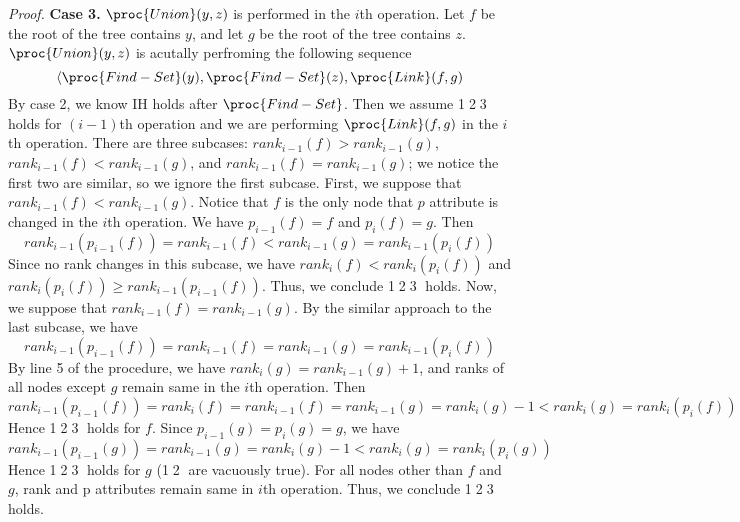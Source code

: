 \begin{proof}
    \textbf{Case 3.}
    $\proc{Union}(y,z)$ is performed in the $i$th operation.
    Let $f$ be the root of the tree contains $y$,
    and let $g$ be the root of the tree contains $z$.
    $\proc{Union}(y,z)$ is acutally perfroming the following sequence
    \begin{equation*}
        \langle \proc{Find-Set}(y), \proc{Find-Set}(z), \proc{Link}(f,g)
    \end{equation*}
    By case 2, we know IH holds after $\proc{Find-Set}$.
    Then we assume \textcircled{1}\textcircled{2}\textcircled{3} holds for $(i-1)$th operation
    and we are performing $\proc{Link}(f,g)$ in the $i$th operation.
    There are three subcases: $rank_{i-1}(f) > rank_{i-1}(g)$, $rank_{i-1}(f) < rank_{i-1}(g)$,
    and $rank_{i-1}(f) = rank_{i-1}(g)$; we notice the first two are similar, 
    so we ignore the first subcase.
    First, we suppose that $rank_{i-1}(f) < rank_{i-1}(g)$.
    Notice that $f$ is the only node that $p$ attribute is changed in the $i$th operation.
    We have $p_{i-1}(f) = f$ and $p_i(f) = g$.
    Then
    \begin{equation*}
        rank_{i-1}(p_{i-1}(f)) = rank_{i-1}(f) < rank_{i-1}(g) = rank_{i-1}(p_i(f))
    \end{equation*}
    Since no rank changes in this subcase, we have 
    $rank_{i}(f) < rank_{i}(p_i(f))$ and $rank_{i}(p_i(f)) \geq rank_{i-1}(p_{i-1}(f))$.
    Thus, we conclude \textcircled{1}\textcircled{2}\textcircled{3} holds.
    Now, we suppose that $rank_{i-1}(f) = rank_{i-1}(g)$.
    By the similar approach to the last subcase, we have
    \begin{equation*}
        rank_{i-1}(p_{i-1}(f)) = rank_{i-1}(f) = rank_{i-1}(g) = rank_{i-1}(p_i(f))
    \end{equation*}
    By line 5 of the procedure, we have $rank_{i}(g) = rank_{i-1}(g) + 1$,
    and ranks of all nodes except $g$ remain same in the $i$th operation.
    Then
    \begin{equation*}
        rank_{i-1}(p_{i-1}(f)) = rank_{i}(f) = rank_{i-1}(f) = rank_{i-1}(g) = rank_{i}(g) - 1 < rank_{i}(g) = rank_{i}(p_i(f))
    \end{equation*}
    Hence \textcircled{1}\textcircled{2}\textcircled{3} holds for $f$.
    Since $p_{i-1}(g) = p_i(g) = g$, we have
    \begin{equation*}
        rank_{i-1}(p_{i-1}(g)) = rank_{i-1}(g) = rank_{i}(g) - 1 < rank_{i}(g) = rank_{i}(p_i(g))
    \end{equation*}
    Hence \textcircled{1}\textcircled{2}\textcircled{3} holds for $g$ 
    (\textcircled{1}\textcircled{2} are vacuously true).
    For all nodes other than $f$ and $g$, rank and p attributes remain same in $i$th operation.
    Thus, we conclude \textcircled{1}\textcircled{2}\textcircled{3} holds.
\end{proof}

